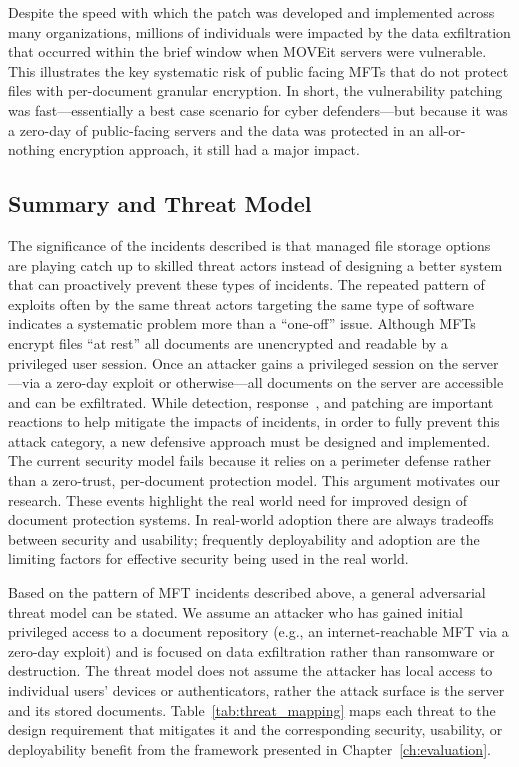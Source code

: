 Despite the speed with which the patch was developed and implemented across many organizations, millions of individuals were impacted by the data exfiltration that occurred within the brief window when MOVEit servers were vulnerable. This illustrates the key systematic risk of public facing MFTs that do not protect files with per-document granular encryption. In short, the vulnerability patching was fast---essentially a best case scenario for cyber defenders---but because it was a zero-day of public-facing servers and the data was protected in an all-or-nothing encryption approach, it still had a major impact.

\subsection{Summary and Threat Model}
\label{sec:threat-summary}

The significance of the incidents described is that managed file storage options are playing catch up to skilled threat actors instead of designing a better system that can proactively prevent these types of incidents. The repeated pattern of exploits often by the same threat actors targeting the same type of software indicates a systematic problem more than a ``one-off'' issue. Although MFTs encrypt files ``at rest'' all documents are unencrypted and readable by a privileged user session. Once an attacker gains a privileged session on the server---via a zero-day exploit or otherwise---all documents on the server are accessible and can be exfiltrated. While detection, response~\cite{ibm_xforce_mft}, and patching are important reactions to help mitigate the impacts of incidents, in order to fully prevent this attack category, a new defensive approach must be designed and implemented. The current security model fails because it relies on a perimeter defense rather than a zero-trust, per-document protection model. This argument motivates our research. These events highlight the real world need for improved design of document protection systems. In real-world adoption there are always tradeoffs between security and usability; frequently deployability and adoption are the limiting factors for effective security being used in the real world.

Based on the pattern of MFT incidents described above, a general adversarial threat model can be stated. We assume an attacker who has gained initial privileged access to a document repository (e.g., an internet-reachable MFT via a zero-day exploit) and is focused on data exfiltration rather than ransomware or destruction. The threat model does not assume the attacker has local access to individual users' devices or authenticators, rather the attack surface is the server and its stored documents. Table~\ref{tab:threat_mapping} maps each threat to the design requirement that mitigates it and the corresponding security, usability, or deployability benefit from the framework presented in Chapter~\ref{ch:evaluation}.

